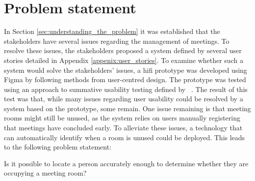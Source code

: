 \section{Problem statement}\label{sec:problem_statement}
In Section \ref{sec:understanding_the_problem} it was established that the stakeholders have several issues regarding the management of meetings. 
To resolve these issues, the stakeholders proposed a system defined by several user stories detailed in Appendix \ref{appenix:user_stories}. 
To examine whether such a system would solve the stakeholders' issues, a hifi prototype was developed using Figma\cite{Figma} by following methods from user-centred design.
The prototype was tested using an approach to summative usability testing defined by \citeauthor{lazar2005web}~\cite{lazar2005web}. 
The result of this test was that, while many issues regarding user usability could be resolved by a system based on the prototype, some remain. 
One issue remaining is that meeting rooms might still be unused, as the system relies on users manually registering that meetings have concluded early.
To alleviate these issues, a technology that can automatically identify when a room is unused could be deployed. This leads to the following problem statement:
\begin{problem_statement}
    Is it possible to locate a person accurately enough to determine whether they are occupying a meeting room?
\end{problem_statement}


